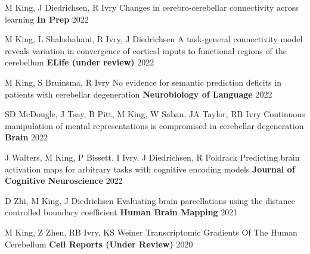 


\begin{cventries}

  \cventry
    {M King, J Diedrichsen, R Ivry} %
    {Changes in cerebro-cerebellar connectivity across learning} %
    {\textbf{In Prep}} %
    {2022} %
    {}
    

  \cventry
    {M King, L Shahshahani, R Ivry, J Diedrichsen} %
    {A task-general connectivity model reveals variation in convergence of cortical inputs to functional regions of the cerebellum} %
    {\textbf{ELife (under review)}} %
    {2022} %
    {}

\begin{cventries}

  \cventry
    {M King, S Bruinsma, R Ivry} %
    {No evidence for semantic prediction deficits in patients with cerebellar degeneration} %
    {\textbf{Neurobiology of Language}} %
    {2022} %
    {}

  \cventry
    {SD McDougle, J Tsay, B Pitt, M King, W Saban, JA Taylor, RB Ivry} %
    {Continuous manipulation of mental representations is compromised in cerebellar degeneration} %
    {\textbf{Brain}} %
    {2022} %
    {}
    
  \cventry
    {J Walters, M King, P Bissett, I Ivry, J Diedrichsen, R Poldrack} %
    {Predicting brain activation maps for arbitrary tasks with cognitive encoding models} %
    {\textbf{Journal of Cognitive Neuroscience}} %
    {2022} %
    {}
   
  \cventry
    {D Zhi, M King, J Diedrichsen} %
    {Evaluating brain parcellations using the distance controlled boundary coefficient} %
    {\textbf{Human Brain Mapping}} %
    {2021} %
    {}
    
  \cventry
    {M King, Z Zhen, RB Ivry, KS Weiner} %
    {Transcriptomic Gradients Of The Human Cerebellum} %
    {\textbf{Cell Reports (Under Review)}} %
    {2020} %
    {}
    

\end{cventries}
\end{cventries}
